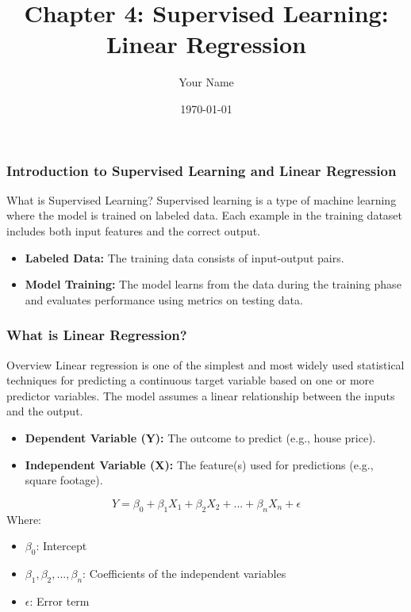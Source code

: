 \documentclass[aspectratio=169]{beamer}
\title[Supervised Learning: Linear Regression]{Chapter 4: Supervised Learning: Linear Regression}
\author[Your Name]{Your Name}
\date{\today}
\begin{document}
\frame{\titlepage}

\begin{frame}[fragile]
    \frametitle{Introduction to Supervised Learning and Linear Regression}
    \begin{block}{What is Supervised Learning?}
        Supervised learning is a type of machine learning where the model is trained on labeled data. Each example in the training dataset includes both input features and the correct output.
    \end{block}
    \begin{itemize}
        \item \textbf{Labeled Data:} The training data consists of input-output pairs.
        \item \textbf{Model Training:} The model learns from the data during the training phase and evaluates performance using metrics on testing data.
    \end{itemize}
\end{frame}

\begin{frame}[fragile]
    \frametitle{What is Linear Regression?}
    \begin{block}{Overview}
        Linear regression is one of the simplest and most widely used statistical techniques for predicting a continuous target variable based on one or more predictor variables. The model assumes a linear relationship between the inputs and the output.
    \end{block}
    \begin{itemize}
        \item \textbf{Dependent Variable (Y):} The outcome to predict (e.g., house price).
        \item \textbf{Independent Variable (X):} The feature(s) used for predictions (e.g., square footage).
    \end{itemize}
    \begin{equation}
        Y = \beta_0 + \beta_1 X_1 + \beta_2 X_2 + ... + \beta_n X_n + \epsilon
    \end{equation}
    Where:
    \begin{itemize}
        \item \( \beta_0 \): Intercept
        \item \( \beta_1, \beta_2, ..., \beta_n \): Coefficients of the independent variables
        \item \( \epsilon \): Error term
    \end{itemize}
\end{frame}
\end{document}

